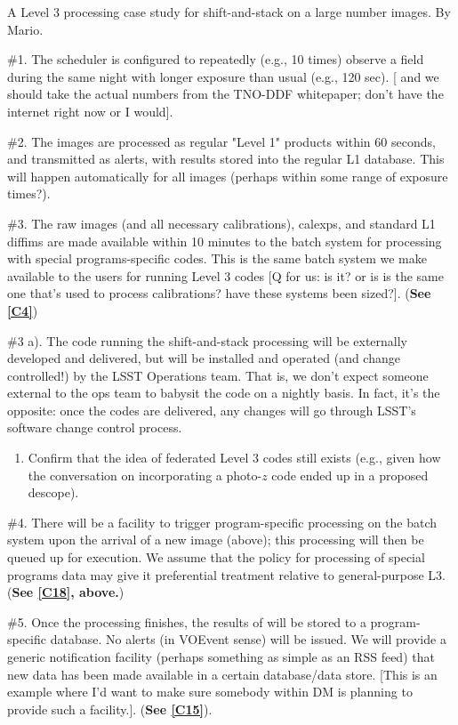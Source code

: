 \documentclass[DM,lsstdraft,toc]{lsstdoc}
\begin{document}
A Level 3 processing case study for shift-and-stack on a large number images. By Mario.

\#1. The scheduler is configured to repeatedly (e.g., 10 times) observe a field during the same night with longer exposure than usual (e.g., 120 sec). [ and we should take the actual numbers from the TNO-DDF whitepaper; don't have the internet right now or I would].

\#2. The images are processed as regular "Level 1" products within 60 seconds, and transmitted as alerts, with results stored into the regular L1 database. This will happen automatically for all images (perhaps within some range of exposure times?).

\#3. The raw images (and all necessary calibrations), calexps, and standard L1 diffims are made available within 10 minutes to the batch system for processing with special programs-specific codes. This is the same batch system we make available to the users for running Level 3 codes [Q for us: is it? or is is the same one that's used to process calibrations? have these systems been sized?]. (\textbf{See \ref{C4}})

\#3 a). The code running the shift-and-stack processing will be externally developed and delivered, but will be installed and operated (and change controlled!) by the LSST Operations team. That is, we don't expect someone external to the ops team to babysit the code on a nightly basis. In fact, it's the opposite: once the codes are delivered, any changes will go through LSST's software change control process.
\begin{enumerate}[resume,topsep=-10pt,label= \textbf{Concern \Roman*.}] \item \label{C18} Confirm that the idea of federated Level 3 codes still exists (e.g., given how the conversation on incorporating a photo-$z$ code ended up in a proposed descope). \end{enumerate}

\#4. There will be a facility to trigger program-specific processing on the batch system upon the arrival of a new image (above); this processing will then be queued up for execution. We assume that the policy for processing of special programs data may give it preferential treatment relative to general-purpose L3. (\textbf{See \ref{C18}, above.})

\#5. Once the processing finishes, the results of will be stored to a program-specific database. No alerts (in VOEvent sense) will be issued. We will provide a generic notification facility (perhaps something as simple as an RSS feed) that new data has been made available in a certain database/data store. [This is an example where I'd want to make sure somebody within DM is planning to provide such a facility.]. (\textbf{See \ref{C15}}).
\end{document}
